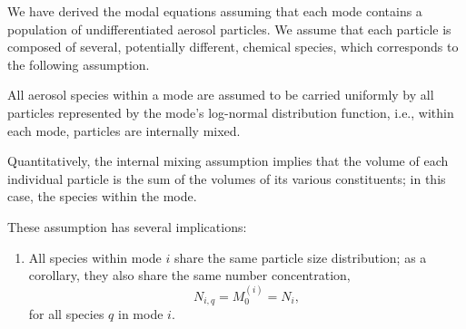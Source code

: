 We have derived the modal equations assuming that each mode contains a
population of undifferentiated aerosol particles. 
We assume that each particle is composed of several, potentially different, chemical species, which corresponds to the following assumption.
%
%
%
%
%
%

\begin{assume}
  All aerosol species within a mode are assumed to be carried uniformly by all particles represented by the mode's log-normal distribution function, i.e., within each mode, particles are internally mixed.
\end{assume}

\begin{assume}
  Quantitatively, the internal mixing assumption implies that the volume of each individual particle is the sum of the volumes of its various constituents; in this case, the species within the mode.  
\end{assume}


These assumption has several implications:
\begin{enumerate}
  \item All species within mode $i$ share the same particle size distribution; as a corollary, they also share the same number concentration,
  \begin{equation}
    N_{i,q} = M_0^{(i)} = N_i,
  \end{equation}
  for all species $q$ in mode $i$.
\end{enumerate}
